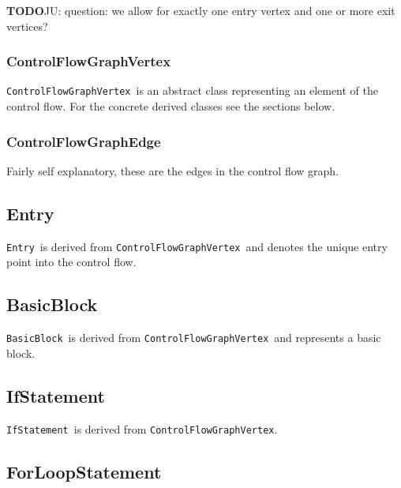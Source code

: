 \documentclass{book}
\newcommand{\todo}{{\bf TODO}}
\newcommand{\BasicBlock}{{\tt BasicBlock}}
\newcommand{\ControlFlowGraphVertex}{{\tt ControlFlowGraphVertex}}
\newcommand{\Entry}{{\tt Entry}}
\newcommand{\IfStatement}{{\tt IfStatement}}
\begin{document}
\todo JU: question: we allow for exactly one entry vertex and one or 
more exit vertices?

\subsubsection{ControlFlowGraphVertex} 
\ControlFlowGraphVertex\ is an abstract class representing an 
element of the control flow. For the concrete derived classes 
see the sections below. 

\subsubsection{ControlFlowGraphEdge} 
Fairly self explanatory, these are the edges in the control flow 
graph. 


\subsection{Entry}
\label{ssec:Entry}

\Entry\ is derived from \ControlFlowGraphVertex\ and denotes the 
unique entry point into the control flow.

\subsection{BasicBlock}
\label{ssec:BasicBlock}

\BasicBlock\ is derived from \ControlFlowGraphVertex\ and represents a
basic block.

\subsection{IfStatement}
\label{ssec:IfStatement}

\IfStatement\ is derived from \ControlFlowGraphVertex.

\subsection{ForLoopStatement}
\label{ssec:ForLoopStatement}
\end{document}

